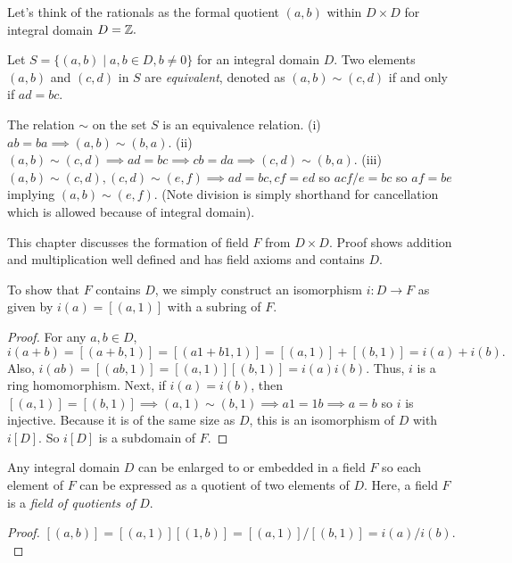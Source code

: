 \begin{remark}
    Let's think of the rationals as the formal quotient $(a,b)$ within $D \times D$ for integral domain $D = \mathbb{Z}.$
\end{remark}
\begin{definition}[Equivalent]
    Let $S = \{(a,b) \mid a,b \in D, b \neq 0\}$ for an integral domain $D$. Two elements $(a,b)$ and $(c,d)$ in $S$ are \emph{equivalent}, denoted as $(a,b) \sim (c,d)$ if and only if $ad=bc.$
\end{definition}
\begin{lemma}
    The relation $\sim$ on the set $S$ is an equivalence relation. (i) $ab = ba \implies (a,b) \sim (b,a).$ (ii) $(a,b) \sim (c,d) \implies ad = bc \implies cb = da \implies (c,d) \sim (b,a).$ (iii) $(a,b) \sim (c,d), (c,d) \sim (e,f) \implies ad = bc, cf = ed$ so $acf/e = bc$ so $af = be$ implying $(a,b) \sim (e,f).$ (Note division is simply shorthand for cancellation which is allowed because of integral domain).
\end{lemma}
\begin{note}
    This chapter discusses the formation of field $F$ from $D \times D$. Proof shows addition and multiplication well defined and has field axioms and contains $D$.
\end{note}
\begin{lemma}
    To show that $F$ contains $D$, we simply construct an isomorphism $i\colon D\to F$ as given by $i(a) = [(a,1)]$ with a subring of $F$.
\end{lemma}
\begin{proof}
    For any $a,b \in D$, $i(a+b) = [(a+b, 1)] = [(a1+b1,1)] = [(a,1)] + [(b,1)] = i(a) + i(b).$ Also, $i(ab) = [(ab,1)] = [(a,1)][(b,1)] = i(a)i(b).$ Thus, $i$ is a ring homomorphism. Next, if $i(a) = i(b)$, then $[(a,1)] = [(b,1)] \implies (a,1) \sim (b,1) \implies a1 = 1b \implies a=b$ so $i$ is injective. Because it is of the same size as $D$, this is an isomorphism of $D$ with $i[D].$ So $i[D]$ is a subdomain of $F$.
\end{proof}
\begin{theorem}
    Any integral domain $D$ can be enlarged to or embedded in a field $F$ so each element of $F$ can be expressed as a quotient of two elements of $D$. Here, a field $F$ is a \emph{field of quotients of} $D$.
\end{theorem}
\begin{proof}
    $[(a,b)] = [(a,1)][(1,b)] = [(a,1)]/[(b,1)] = i(a)/i(b).$
\end{proof}
